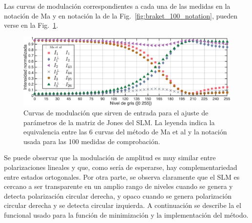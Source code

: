 Las curvas de modulación correspondientes a cada una de las medidas en
la notación de Ma y en notación la de la
Fig.~\ref{fig:braket_100_notation}, pueden verse en la Fig.~\ref{fig:six_input_measures}. 
\begin{figure}[h!]
\centering
\includegraphics[scale=.55]{six_input_measures.pdf}
\caption[Curvas de modulación que sirven de entrada para el ajuste de
parámetros de la matriz de Jones del SLM]{Curvas de modulación que
  sirven de entrada para el ajuste de parámetros de la matriz de Jones
  del SLM. La leyenda indica la equivalencia entre las 6 curvas del
  método de Ma et al y la notación usada para las 100 medidas de comprobación. }
\label{fig:six_input_measures}
\end{figure}
Se puede observar que la modulación de amplitud es muy similar entre
polarizaciones lineales y que, como sería de esperarse, hay
complementariedad entre estados ortogonales.  Por otra parte, se
observa claramente que el SLM es cercano a ser transparente en un
amplio rango de niveles cuando se genera y detecta polarización
circular derecha, y opaco cuando se genera polarización circular
derecha y se detecta circular izquierda.
A continuación se describe la el funcional usado para la función de
minimización y la implementación del método. 
